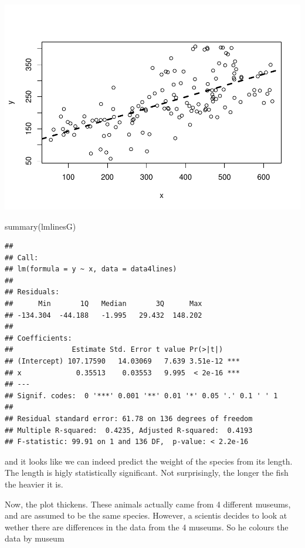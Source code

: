 \documentclass[
]{book}
\newenvironment{Shaded}{\begin{snugshade}}{\end{snugshade}}
\newcommand{\FunctionTok}[1]{\textcolor[rgb]{0.00,0.00,0.00}{#1}}
\newcommand{\NormalTok}[1]{#1}
\begin{document}
\includegraphics{ECOMODbook_files/figure-latex/a7.10-1.pdf}

\begin{Shaded}
\begin{Highlighting}[]
\FunctionTok{summary}\NormalTok{(lmlinesG)}
\end{Highlighting}
\end{Shaded}

\begin{verbatim}
## 
## Call:
## lm(formula = y ~ x, data = data4lines)
## 
## Residuals:
##      Min       1Q   Median       3Q      Max 
## -134.304  -44.188   -1.995   29.432  148.202 
## 
## Coefficients:
##              Estimate Std. Error t value Pr(>|t|)    
## (Intercept) 107.17590   14.03069   7.639 3.51e-12 ***
## x             0.35513    0.03553   9.995  < 2e-16 ***
## ---
## Signif. codes:  0 '***' 0.001 '**' 0.01 '*' 0.05 '.' 0.1 ' ' 1
## 
## Residual standard error: 61.78 on 136 degrees of freedom
## Multiple R-squared:  0.4235, Adjusted R-squared:  0.4193 
## F-statistic: 99.91 on 1 and 136 DF,  p-value: < 2.2e-16
\end{verbatim}

and it looks like we can indeed predict the weight of the species from its length. The length is higly statistically significant. Not surprisingly, the longer the fish the heavier it is.

Now, the plot thickens. These animals actually came from 4 different museums, and are assumed to be the same species. However, a scientis decides to look at wether there are differences in the data from the 4 museums. So he colours the data by museum
\end{document}
